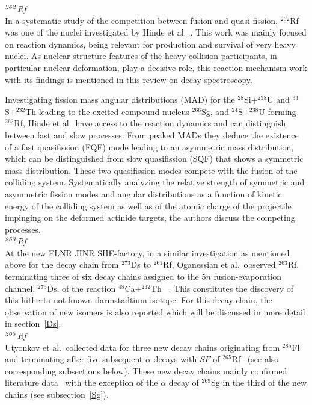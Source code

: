 {\it $^{\it262}$Rf}\\
In a systematic study of the competition between fusion and quasi-fission, $^{262}$Rf was one of the nuclei investigated by Hinde et al.~\cite{Hinde2018}. 
This work was mainly focused on reaction dynamics, being relevant for production and survival of very heavy nuclei. 
As nuclear structure features of the heavy collision participants, in particular nuclear deformation, play a decisive role, this reaction mechanism work with its findings is mentioned in this review on decay spectroscopy. 

Investigating fission mass angular distributions (MAD) for the $^{28}$Si+$^{238}$U and $^{34}$S+$^{232}$Th leading to the excited compound nucleus $^{266}$Sg, and $^{24}$S+$^{238}$U forming $^{262}$Rf, Hinde et al.~have access to the reaction dynamics and can distinguish between fast and slow processes.
From peaked MADs they deduce the existence of a fast quasifission (FQF) mode leading to an asymmetric mass distribution, which can be distinguished from slow quasifission (SQF) that shows a symmetric mass distribution. 
These two quasifission modes compete with the fusion of the colliding system. Systematically analyzing the relative strength of symmetric and asymmetric fission modes and angular distributions as a function of kinetic energy of the colliding system as well as of the atomic charge of the projectile impinging on the deformed actinide targets, the authors discuss the competing processes.\\

{\it $^{\it263}$Rf}\\
At the new FLNR JINR SHE-factory, in a similar investigation as mentioned above for the decay chain from $^{273}$Ds to $^{261}$Rf, Oganessian et al.~observed $^{263}$Rf, terminating three of six decay chains assigned to the 5$n$ fusion-evaporation channel, $^{275}$Ds, of the reaction $^{48}$Ca+$^{232}$Th ~\cite{Oganessian2024}.
This constitutes the discovery of this hitherto not known darmstadtium isotope. 
For this decay chain, the observation of new isomers is also reported which will be discussed in more detail in section~\ref{Ds}.\\

{\it $^{\it265}$Rf}\\
Utyonkov et al.~collected data for three new decay chains originating from $^{285}$Fl and terminating after five subsequent $\alpha$ decays with $SF$ of $^{265}$Rf~\cite{Utyonkov2018} (see also corresponding subsections below). 
These new decay chains mainly confirmed literature data~\cite{Utyonkov2015,Ellison2010} with the  exception of the $\alpha$ decay of $^{269}$Sg in the third of the new chains (see subsection~\ref{Sg}).\\

